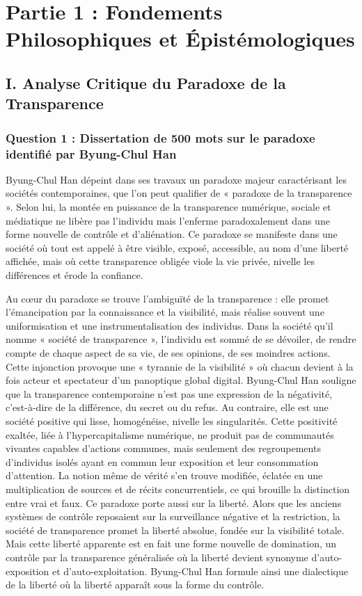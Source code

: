 \documentclass[12pt, a4paper]{article}
\begin{document}
	\section*{Partie 1 : Fondements Philosophiques et Épistémologiques}
	
	\subsection*{I. Analyse Critique du Paradoxe de la Transparence}
	
	\subsubsection*{Question 1 : Dissertation de 500 mots sur le paradoxe identifié par Byung-Chul Han}
	
	Byung-Chul Han dépeint dans ses travaux un paradoxe majeur caractérisant les sociétés contemporaines, que l'on peut qualifier de « paradoxe de la transparence ». Selon lui, la montée en puissance de la transparence numérique, sociale et médiatique ne libère pas l'individu mais l'enferme paradoxalement dans une forme nouvelle de contrôle et d'aliénation. Ce paradoxe se manifeste dans une société où tout est appelé à être visible, exposé, accessible, au nom d'une liberté affichée, mais où cette transparence obligée viole la vie privée, nivelle les différences et érode la confiance.
	
	Au cœur du paradoxe se trouve l'ambiguïté de la transparence : elle promet l'émancipation par la connaissance et la visibilité, mais réalise souvent une uniformisation et une instrumentalisation des individus. Dans la société qu'il nomme « société de transparence », l'individu est sommé de se dévoiler, de rendre compte de chaque aspect de sa vie, de ses opinions, de ses moindres actions. Cette injonction provoque une « tyrannie de la visibilité » où chacun devient à la fois acteur et spectateur d'un panoptique global digital. Byung-Chul Han souligne que la transparence contemporaine n'est pas une expression de la négativité, c'est-à-dire de la différence, du secret ou du refus. Au contraire, elle est une société positive qui lisse, homogénéise, nivelle les singularités. Cette positivité exaltée, liée à l'hypercapitalisme numérique, ne produit pas de communautés vivantes capables d'actions communes, mais seulement des regroupements d'individus isolés ayant en commun leur exposition et leur consommation d'attention. La notion même de vérité s'en trouve modifiée, éclatée en une multiplication de sources et de récits concurrentiels, ce qui brouille la distinction entre vrai et faux. Ce paradoxe porte aussi sur la liberté. Alors que les anciens systèmes de contrôle reposaient sur la surveillance négative et la restriction, la société de transparence promet la liberté absolue, fondée sur la visibilité totale. Mais cette liberté apparente est en fait une forme nouvelle de domination, un contrôle par la transparence généralisée où la liberté devient synonyme d'auto-exposition et d'auto-exploitation. Byung-Chul Han formule ainsi une dialectique de la liberté où la liberté apparaît sous la forme du contrôle.
	
\end{document}
